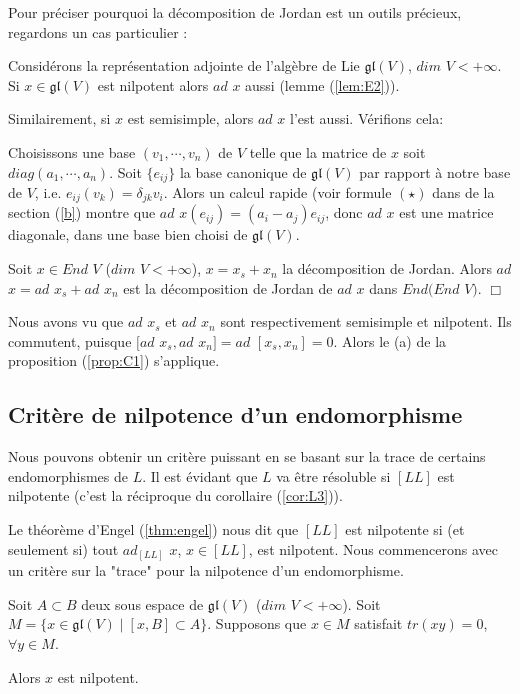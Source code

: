 \documentclass[a4paper,openany,12pt]{report}
\newcommand{\gl}{\mathfrak{gl}}
\theoremstyle{break}
{\theorembodyfont{\upshape}
\newtheorem*{rmq}{Remarque :}
\newtheorem*{prv}{Preuve :}
\newtheorem*{ex}{Exemples :}
\newtheorem*{exe}{Exemple : }
\newtheorem*{nota}{Notation :}
\newtheorem*{dem}{D\'emonstration :}}
\begin{document}
Pour préciser pourquoi la décomposition de Jordan est un outils précieux, regardons un cas particulier :

\begin{ex}
\quad Considérons la représentation adjointe de l'algèbre de Lie $\gl(V)$, $dim$ $V < +\infty$. Si $x \in \gl(V)$ est nilpotent alors $ad$ $x$ aussi (lemme (\ref{lem:E2})).

Similairement, si $x$ est semisimple, alors $ad$ $x$ l'est aussi. Vérifions cela: 

Choisissons une base $(v_{1},\cdots,v_{n})$ de $V$ telle que la matrice de $x$ soit $diag(a_{1},\cdots,a_{n})$. Soit $\{ e_{ij} \}$ la base canonique de $\gl(V)$ par rapport à notre base de $V$, i.e. $e_{ij}(v_{k})=\delta_{jk}v_{i}$. Alors un calcul rapide (voir formule $(\star)$ dans de la section (\ref{b}) montre que $ad$ $x(e_{ij})=(a_{i}-a_{j})e_{ij}$, donc $ad$ $x$ est une matrice diagonale, dans une base bien choisi de $\gl(V)$. 
\end{ex}

\begin{lem}\label{lem:C1}
\quad Soit $x \in End$ $V$ ($dim$ $V < +\infty$), $x=x_{s}+x_{n}$ la décomposition de Jordan. Alors $ad$ $x = ad$ $x_{s}+ad$ $x_{n}$ est la décomposition de Jordan de $ad$ $x$ dans $End(End$ $V)$. $\Box$
\end{lem}

\begin{prv}
\quad Nous avons vu que $ad$ $x_{s}$ et $ad$ $x_{n}$ sont respectivement semisimple et nilpotent. Ils commutent, puisque $[ad$ $x_{s},ad$ $x_{n}] = ad$ $[x_{s},x_{n}]=0$. Alors le (a) de la proposition (\ref{prop:C1}) s'applique.
\end{prv}

\subsection{Critère de nilpotence d'un endomorphisme}\label{a}

Nous pouvons obtenir un critère puissant en se basant sur la trace de certains endomorphismes de $L$. Il est évidant que $L$ va être résoluble si $[LL]$ est nilpotente (c'est la réciproque du corollaire (\ref{cor:L3})).

Le théorème d'Engel (\ref{thm:engel}) nous dit que $[LL]$ est nilpotente si (et seulement si) tout $ad_{[LL]}$ $x$, $x \in [LL]$, est nilpotent. Nous commencerons avec un critère sur la "trace" pour la nilpotence d'un endomorphisme.

\begin{lem}\label{lem:C2}
\quad Soit $A \subset B$ deux sous espace de $\gl(V)$ ($dim$ $V<+\infty$). Soit $M= \{ x \in \gl(V) \mid [x,B] \subset A \}$. Supposons que $x \in M$ satisfait $tr(xy)=0$, $\forall y \in M$.

Alors $x$ est nilpotent. 
\end{lem}
\end{document}
